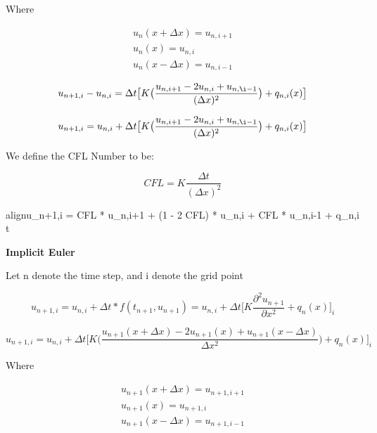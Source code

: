 \documentclass[10pt, letter, showtrims]{extarticle}
\newcommand{\boxedeq}[2]{\begin{empheq}[box={\fboxsep=6pt\fbox}]{align}\label{#1}#2\end{empheq}}
\begin{document}
		\noindent
		Where
		
		\begin{equation}
			\begin{split}
				u_{n}(x + \Delta x) = u_{n,i+1} \\
				u_{n}(x)            = u_{n,i} \\
				u_{n}(x - \Delta x) = u_{n,i-1}
			\end{split}
		\end{equation}
		
		\begin{equation}
			u_{n+1,i} - u_{n,i} = \Delta t \big[ K \big(\frac{u_{n,i+1} - 2 u_{n,i} + u_{n,\i-1}}{(\Delta x)^{2}}\big) + q_{n,i}(x) \big]
		\end{equation}
		
		\begin{equation}
			u_{n+1,i} = u_{n,i} + \Delta t \big[ K \big(\frac{u_{n,i+1} - 2 u_{n,i} + u_{n,\i-1}}{(\Delta x)^{2}}\big) + q_{n,i}(x) \big]
		\end{equation}
		
		\noindent
		We define the CFL Number to be:
		
		\begin{equation}
			CFL = K \frac{\Delta t}{(\Delta x)^{2}}
		\end{equation}
	
		\boxedeq{}{u_{n+1,i} = CFL * u_{n,i+1} + (1 - 2 CFL) * u_{n,i} + CFL * u_{n,i-1} + q_{n,i} \Delta t}
		
		\pagebreak
		
		\noindent
		\textbf{Implicit Euler}
		
		\noindent
		Let n denote the time step, and i denote the grid point
		
		\begin{equation}
			u_{n+1,i} = u_{n,i} + \Delta t * f(t_{n+1}, u_{n+1}) = u_{n,i} + \Delta t \big[ K \frac{\partial^{2} u_{n+1}}{\partial x^{2}} + q_{n}(x)\big]_{i}
		\end{equation}
		
		\begin{equation}
			u_{n+1,i} = u_{n,i} + \Delta t \big[ K \big(\frac{u_{n+1}(x + \Delta x) - 2 u_{n+1} (x) + u_{n+1} (x - \Delta x)}{\Delta x^{2}} \big) + q_{n}(x)\big]_{i}
		\end{equation}
	
		\noindent
		Where
		
		\begin{equation}
			\begin{split}
				u_{n+1}(x + \Delta x) = u_{n+1,i+1} \\
				u_{n+1}(x)            = u_{n+1,i} \\
				u_{n+1}(x - \Delta x) = u_{n+1,i-1}
			\end{split}
		\end{equation}
		
\end{document}

